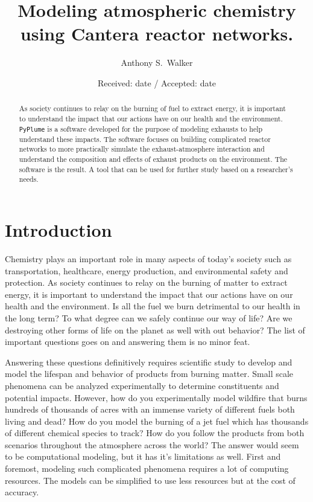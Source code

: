 \documentclass[smallextended,referee]{svjour3}
\begin{document}
\title{Modeling atmospheric chemistry using Cantera reactor networks.}


\author{Anthony S.~Walker}

\date{Received: date / Accepted: date}
\def\pyplume{\texttt{PyPlume}}
\def\SCALE{0.5}

\maketitle 

\begin{abstract}
As society continues to relay on the burning of fuel to extract energy, it is important to understand the impact that our actions have on our health and the environment. \pyplume{} is a software developed for the purpose of modeling exhausts to help understand these impacts. The software focuses on building complicated reactor networks to more practically simulate the exhaust-atmosphere interaction and understand the composition and effects of exhaust products on the environment. The software is the result. A tool that can be used for further study based on a researcher's needs. 
\end{abstract}


\section{Introduction}
Chemistry plays an important role in many aspects of today's society such as transportation, healthcare, energy production, and environmental safety and protection. As society continues to relay on the burning of matter to extract energy, it is important to understand the impact that our actions have on our health and the environment. Is all the fuel we burn detrimental to our health in the long term? To what degree can we safely continue our way of life? Are we destroying other forms of life on the planet as well with out behavior? The list of important questions goes on and answering them is no minor feat.

Answering these questions definitively requires scientific study to develop and model the lifespan and behavior of products from burning matter. Small scale phenomena can be analyzed experimentally to determine constituents and potential impacts. However, how do you experimentally model wildfire that burns hundreds of thousands of acres with an immense variety of different fuels both living and dead? How do you model the burning of a jet fuel which has thousands of different chemical species to track? How do you follow the products from both scenarios throughout the atmosphere across the world? The answer would seem to be computational modeling, but it has it's limitations as well. First and foremost, modeling such complicated phenomena requires a lot of computing resources. The models can be simplified to use less resources but at the cost of accuracy.
\end{document}
